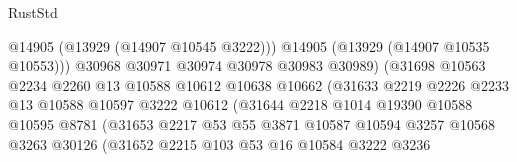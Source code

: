 \begin{lexlean}{RustStd}
\begin{coremodule}
                                          @14905
                                          (@13929 (@14907 @10545 @3222)))
                                        @14905
                                        (@13929 (@14907 @10535 @10553)))
                                      @30968
                                      @30971
                                      @30974
                                      @30978
                                      @30983
                                      @30989)
                                    (@31698
                                      @10563
                                      @2234
                                      @2260
                                      @13
                                      @10588
                                      @10612
                                      @10638
                                      @10662
                                      (@31633
                                        @2219
                                        @2226
                                        @2233
                                        @13
                                        @10588
                                        @10597
                                        @3222
                                        @10612
                                        (@31644
                                          @2218
                                          @1014
                                          @19390
                                          @10588
                                          @10595
                                          @8781
                                          (@31653
                                            @2217
                                            @53
                                            @55
                                            @3871
                                            @10587
                                            @10594
                                            @3257
                                            @10568
                                            @3263
                                            @30126
                                            (@31652
                                              @2215
                                              @103
                                              @53
                                              @16
                                              @10584
                                              @3222
                                              @3236

\end{coremodule}
\end{lexlean}
